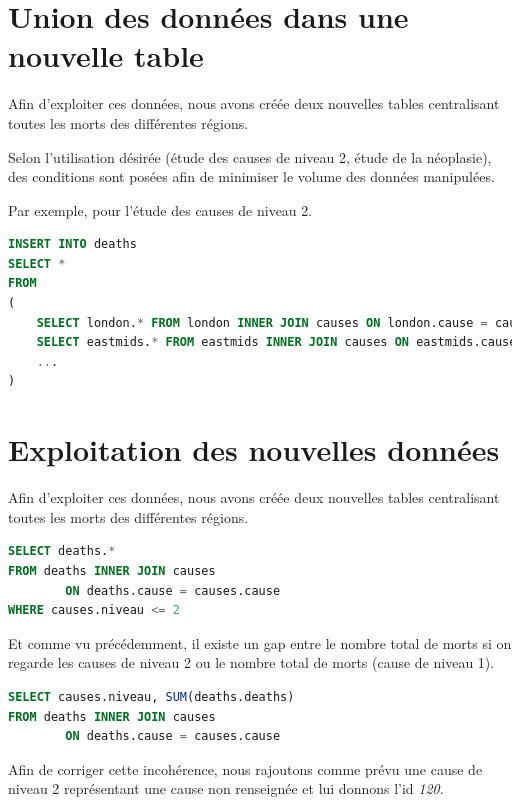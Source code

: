 \section{Union des données dans une nouvelle table}

    Afin d'exploiter ces données, nous avons créée deux nouvelles tables centralisant toutes les morts des différentes régions.

    Selon l'utilisation désirée (étude des causes de niveau 2, étude de la néoplasie), des conditions sont posées afin
    de minimiser le volume des données manipulées.

    Par exemple, pour l'étude des causes de niveau 2.

    \begin{lstlisting}[frame=single, language=SQL]
INSERT INTO deaths
SELECT *
FROM
(
    SELECT london.* FROM london INNER JOIN causes ON london.cause = causes.cause WHERE causes.niveau <= 2 UNION
    SELECT eastmids.* FROM eastmids INNER JOIN causes ON eastmids.cause = causes.cause WHERE causes.niveau <= 2 UNION
    ...
)
    \end{lstlisting}


\section{Exploitation des nouvelles données}

    Afin d'exploiter ces données, nous avons créée deux nouvelles tables centralisant toutes les morts des différentes régions.

    \begin{lstlisting}[frame=single, language=SQL]
SELECT deaths.*
FROM deaths INNER JOIN causes
        ON deaths.cause = causes.cause
WHERE causes.niveau <= 2
    \end{lstlisting}

    Et comme vu précédemment, il existe un gap entre le nombre total de morts si on regarde les causes de niveau 2 ou le nombre
    total de morts (cause de niveau 1).

    \begin{lstlisting}[frame=single, language=SQL]
SELECT causes.niveau, SUM(deaths.deaths)
FROM deaths INNER JOIN causes
        ON deaths.cause = causes.cause
    \end{lstlisting}

    Afin de corriger cette incohérence, nous rajoutons comme prévu une cause de niveau 2 représentant une cause non renseignée
    et lui donnons l'id \textit{120}.

